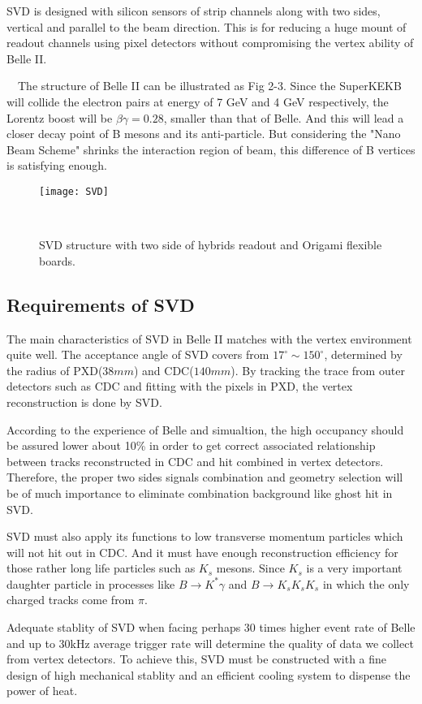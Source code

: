 	SVD is designed with silicon sensors of strip channels along with two sides, vertical and parallel to the beam direction. This is for reducing a huge mount of readout channels using pixel detectors without compromising the vertex ability of Belle II.
	
	　The structure of Belle II can be illustrated as Fig 2-3. Since the SuperKEKB will collide the electron pairs at energy of 7 GeV and 4 GeV respectively, the Lorentz boost will be $\beta \gamma =0.28$, smaller than that of Belle. And this will lead a closer decay point of B mesons and its anti-particle. But considering the "Nano Beam Scheme" shrinks the interaction region of beam, this difference of B vertices is satisfying enough. 
	　\begin{figure}[htbp]
		\centering
		\texttt{[image: SVD]}
		\caption{SVD structure with two side of hybrids readout and Origami flexible boards.}
	　\end{figure}
	
	\subsection{Requirements of SVD}
	The main characteristics of SVD in Belle II matches with the vertex environment quite well. The acceptance angle of SVD covers from $17^\circ \sim 150^\circ$, determined by the radius of PXD($38 mm$) and CDC($140mm$). By tracking the trace from outer detectors such as CDC and fitting with the pixels in PXD, the vertex reconstruction is done by SVD. 
	
	According to the experience of Belle and simualtion, the high occupancy should be assured lower about 10\% in order to get correct associated relationship between tracks reconstructed in CDC and hit combined in vertex detectors. Therefore, the proper two sides signals combination and geometry selection will be of much importance to eliminate combination background like ghost hit in SVD. 
	
	SVD must also apply its functions to low transverse momentum particles which will not hit out in CDC. And it must have enough reconstruction efficiency for those rather long life particles such as $K_{s}$ mesons. Since $K_s$ is a very important daughter particle in processes like $B\to K^{*}\gamma$ and $B\to K_s K_s K_s$ in which the only charged tracks come from $\pi$.
	
	Adequate stablity of SVD when facing perhaps 30 times higher event rate of Belle and up to 30kHz average trigger rate will determine the quality of data we collect from vertex detectors. To achieve this, SVD must be constructed with a fine design of high mechanical stablity and an efficient cooling system to dispense the power of heat. 
	
